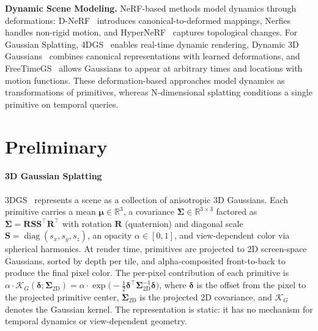\documentclass{article}
\theoremstyle{plain}
\theoremstyle{definition}
\theoremstyle{remark}
\begin{document}
\textbf{Dynamic Scene Modeling.}
NeRF-based methods model dynamics through deformations: D-NeRF~\citep{pumarola2020dnerfneuralradiancefields} introduces canonical-to-deformed mappings, Nerfies~\citep{park2021nerfies} handles non-rigid motion, and HyperNeRF~\citep{park2021hypernerf} captures topological changes. For Gaussian Splatting, 4DGS~\citep{yang2023real} enables real-time dynamic rendering, Dynamic 3D Gaussians~\citep{luiten2023dynamic} combines canonical representations with learned deformations, and FreeTimeGS~\citep{wang2025freetimegs} allows Gaussians to appear at arbitrary times and locations with motion functions. These deformation-based approaches model dynamics as transformations of primitives, whereas N-dimensional splatting conditions a single primitive on temporal queries.


\section{Preliminary}

\paragraph{3D Gaussian Splatting}
3DGS~\citep{3dgs} represents a scene as a collection of anisotropic 3D Gaussians. Each primitive carries a mean $\boldsymbol{\mu}\in\mathbb{R}^3$, a covariance $\boldsymbol{\Sigma}\in\mathbb{R}^{3\times 3}$ factored as $\boldsymbol{\Sigma}=\mathbf{R}\mathbf{S}\mathbf{S}^\top\mathbf{R}^\top$ with rotation $\mathbf{R}$ (quaternion) and diagonal scale $\mathbf{S}=\operatorname{diag}(s_x,s_y,s_z)$, an opacity $\alpha\in[0,1]$, and view-dependent color via spherical harmonics. At render time, primitives are projected to 2D screen-space Gaussians, sorted by depth per tile, and alpha-composited front-to-back to produce the final pixel color. The per-pixel contribution of each primitive is $\alpha\cdot\mathcal{K}_G(\boldsymbol{\delta};\boldsymbol{\Sigma}_{\text{2D}}) = \alpha\cdot\exp\!\bigl(-\tfrac{1}{2}\boldsymbol{\delta}^\top\boldsymbol{\Sigma}_{\text{2D}}^{-1}\boldsymbol{\delta}\bigr)$, where $\boldsymbol{\delta}$ is the offset from the pixel to the projected primitive center, $\boldsymbol{\Sigma}_{\text{2D}}$ is the projected 2D covariance, and $\mathcal{K}_G$ denotes the Gaussian kernel. The representation is static: it has no mechanism for temporal dynamics or view-dependent geometry.
\end{document}
